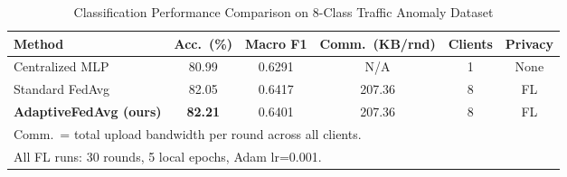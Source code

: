 \begin{table}[htbp]
\centering
\caption{Classification Performance Comparison on 8-Class Traffic Anomaly Dataset}
\label{tab:performance_comparison}
\setlength{\tabcolsep}{5pt}
\begin{tabular}{lccccc}
\toprule
\textbf{Method} & \textbf{Acc.~(\%)} & \textbf{Macro F1} & \textbf{Comm.~(KB/rnd)} & \textbf{Clients} & \textbf{Privacy} \\
\midrule
Centralized MLP      & 80.99          & 0.6291          & N/A        & 1 & None \\
Standard FedAvg      & 82.05          & 0.6417          & 207.36     & 8 & FL   \\
\textbf{AdaptiveFedAvg (ours)} & \textbf{82.21} & 0.6401 & 207.36 & 8 & FL   \\
\bottomrule
\multicolumn{6}{l}{\footnotesize{Comm.~= total upload bandwidth per round across all clients.}}\\
\multicolumn{6}{l}{\footnotesize{All FL runs: 30 rounds, 5 local epochs, Adam lr=0.001.}}\\
\end{tabular}
\end{table}
